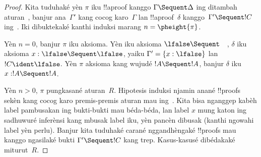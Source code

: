 \documentclass[../../../include/open-logic-section]{subfiles}
\begin{document}
\begin{proof}
  Kita tuduhaké yèn $\pi$ iku !!a{proof} kanggo
  $\Gamma \Sequent \Delta$ ing  ditambah aturan~\Cut,
  banjur ana~$\Gamma'$ kang cocog karo~$\Gamma$ lan
  !!a{proof}~$\delta$ kanggo~$\Gamma' \Sequent !C$ ing~.
  Iki dibuktekaké kanthi induksi marang $n = \pheight{\pi}$.

  Yèn $n = 0$, banjur $\pi$ iku aksioma. Yèn iku aksioma
  $\lfalse \Sequent \quad$, $\delta$ iku aksioma
  $x:\lfalse \Sequent \lfalse$, yaiku
  $\Gamma' = \{x:\lfalse\}$ lan $!C \ident \lfalse$.
  Yèn $\pi$ aksioma kang wujudé $!A \Sequent !A$,
  banjur $\delta$ iku $x: !A \Sequent !A$.
  
  Yèn $n>0$, $\pi$ pungkasané aturan~$R$. Hipotesis induksi
  njamin anané !!{proof}s sekèn kang cocog karo premis-premis
  aturan mau ing~. Kita bisa nganggep kabèh label
  pambusakan ing bukti-bukti mau béda-béda, lan label $x$
  mung katon ing sadhuwuré inferènsi kang mbusak label iku,
  yèn pancèn dibusak (kanthi ngowahi label yèn perlu).
  Banjur kita tuduhaké carané nggandhèngaké !!{proof}s mau
  kanggo ngasilaké bukti $\Gamma' \Sequent !C$ kang trep.
  Kasus-kasusé dibédakaké miturut~$R$.


\end{proof}
\end{document}
